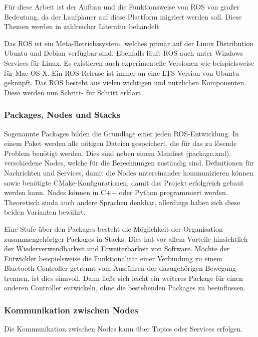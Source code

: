 Für diese Arbeit ist der Aufbau und die Funktionsweise von \ac{ROS} von großer Bedeutung, da der Laufplaner auf diese Plattform migriert werden soll. Diese Themen werden in zahlreicher Literatur behandelt. \autocite{rosAnOpenSourceRobotOperatingSystem} \autocite{learningROSForRoboticsProgramming} \autocite{gentleIntroductionToROS}

Das \ac{ROS} ist ein Meta-Betriebssystem, welches primär auf der Linux Distribution Ubuntu und Debian verfügbar sind. Ebenfalls läuft \ac{ROS} auch unter Windows Services für Linux. Es existieren auch experimentelle Versionen wie beispielsweise für Mac OS X. Ein ROS-Release ist immer an eine \ac{LTS}-Version von Ubuntu  geknüpft. Das \ac{ROS} besteht aus vielen wichtigen und nützlichen Komponenten. Diese werden nun Schritt- für Schritt erklärt.

\subsubsection{Packages, Nodes und Stacks}

Sogenannte Packages bilden die Grundlage einer jeden \ac{ROS}-Entwicklung. In einem Paket werden alle nötigen Dateien gespeichert, die für das zu lösende Problem benötigt werden. Dies sind neben einem Manifest (package.xml), verschiedene Nodes, welche für die Berechnungen zuständig sind, Definitionen für Nachrichten und Services, damit die Nodes untereinander kommunizieren können sowie benötigte CMake-Konfigurationen, damit das Projekt erfolgreich gebaut werden kann. Nodes können in C++ oder Python programmiert werden. Theoretisch sinda auch andere Sprachen denkbar, allerdings haben sich diese beiden Varianten bewährt.

Eine Stufe über den Packages besteht die Möglichkeit der Organisation zusammengehöriger Packages in Stacks. Dies hat vor allem Vorteile hinsichtlich der Wiederverwendbarkeit und Erweiterbarkeit von Software. Möchte der Entwickler beispielsweise die Funktionalität einer Verbindung zu einem Bluetooth-Controller getrennt vom Ausführen der dazugehörigen Bewegung trennen, ist dies sinnvoll. Dann ließe sich leicht ein weiteres Package für einen anderen Controller entwickeln, ohne die bestehenden Packages zu beeinflussen.

\subsubsection{Kommunikation zwischen Nodes}

Die Kommunikation zwischen Nodes kann über Topics oder Services erfolgen.

